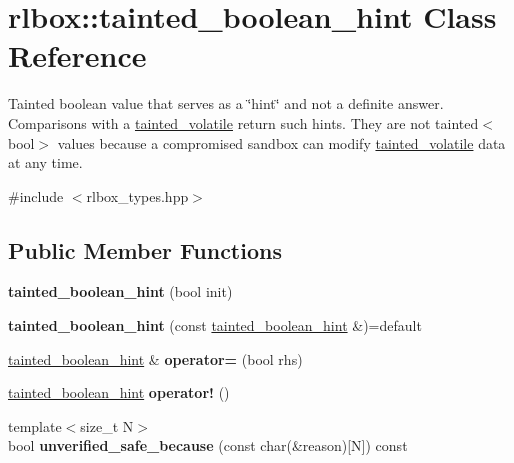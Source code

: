 \hypertarget{classrlbox_1_1tainted__boolean__hint}{}\section{rlbox\+:\+:tainted\+\_\+boolean\+\_\+hint Class Reference}
\label{classrlbox_1_1tainted__boolean__hint}


Tainted boolean value that serves as a \char`\"{}hint\char`\"{} and not a definite answer. Comparisons with a \hyperlink{classrlbox_1_1tainted__volatile}{tainted\+\_\+volatile} return such hints. They are not {\ttfamily tainted$<$bool$>$} values because a compromised sandbox can modify \hyperlink{classrlbox_1_1tainted__volatile}{tainted\+\_\+volatile} data at any time.  




{\ttfamily \#include $<$rlbox\+\_\+types.\+hpp$>$}

\subsection*{Public Member Functions}
\begin{DoxyCompactItemize}
\item 
\mbox{\label{classrlbox_1_1tainted__boolean__hint_a14cea878f2d1cbf8722491cc0abe875f}} 
{\bfseries tainted\+\_\+boolean\+\_\+hint} (bool init)
\item 
\mbox{\label{classrlbox_1_1tainted__boolean__hint_adea514e39039a1278dc00b59ec911ce2}} 
{\bfseries tainted\+\_\+boolean\+\_\+hint} (const \hyperlink{classrlbox_1_1tainted__boolean__hint}{tainted\+\_\+boolean\+\_\+hint} \&)=default
\item 
\mbox{\label{classrlbox_1_1tainted__boolean__hint_accd26753a15b8c1510418a1b0ef6ac81}} 
\hyperlink{classrlbox_1_1tainted__boolean__hint}{tainted\+\_\+boolean\+\_\+hint} \& {\bfseries operator=} (bool rhs)
\item 
\mbox{\label{classrlbox_1_1tainted__boolean__hint_ae47718163139bbc69009f5d853700690}} 
\hyperlink{classrlbox_1_1tainted__boolean__hint}{tainted\+\_\+boolean\+\_\+hint} {\bfseries operator!} ()
\item 
\mbox{\label{classrlbox_1_1tainted__boolean__hint_abf39ef53dfd6b06017c127ef9370bb19}} 
{\footnotesize template$<$size\+\_\+t N$>$ }\\bool {\bfseries unverified\+\_\+safe\+\_\+because} (const char(\&reason)\mbox{[}N\mbox{]}) const
\end{DoxyCompactItemize}


